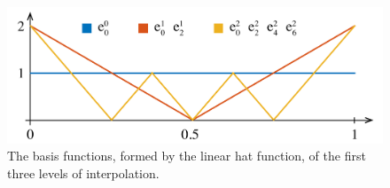 \begin{figure}
  \centering
  \includegraphics[width=1.0\columnwidth]{include/assets/figures/basis.pdf}
  \caption{
    The basis functions, formed by the linear hat function, of the first three
    levels of interpolation.
  }
\end{figure}
